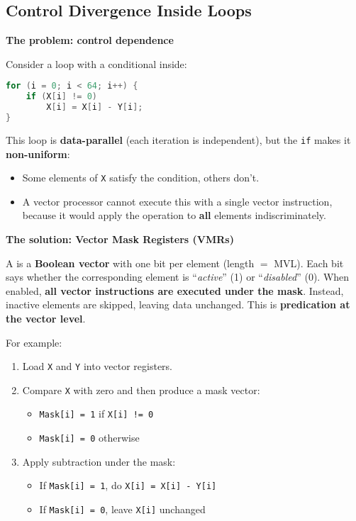 \subsection{Control Divergence Inside Loops}

\begin{flushleft}
    \textcolor{Red2}{ \textbf{The problem: control dependence}}
\end{flushleft}
Consider a loop with a conditional inside:
\begin{lstlisting}[language=c]
for (i = 0; i < 64; i++) {
    if (X[i] != 0)
        X[i] = X[i] - Y[i];
}\end{lstlisting}
This loop is \textbf{data-parallel} (each iteration is independent), but the \texttt{if} makes it \textbf{non-uniform}:
\begin{itemize}
    \item Some elements of \texttt{X} satisfy the condition, others don't.
    \item A \naive vector processor cannot execute this with a single vector instruction, because it would apply the operation to \textbf{all} elements indiscriminately.
\end{itemize}

\highspace
\begin{flushleft}
    \textcolor{Green3}{ \textbf{The solution: Vector Mask Registers (VMRs)}}
\end{flushleft}
A  is a \textbf{Boolean vector} with one bit per element (length $=$ MVL). Each bit says whether the corresponding element is ``\emph{active}'' (1) or ``\emph{disabled}'' (0). When enabled, \textbf{all vector instructions are executed under the mask}. Instead, inactive elements are skipped, leaving data unchanged. This is \textbf{predication at the vector level}.

\highspace
For example:
\begin{enumerate}
    \item Load \texttt{X} and \texttt{Y} into vector registers.
    \item Compare \texttt{X} with zero and then produce a mask vector:
    \begin{itemize}
        \item \texttt{Mask[i] = 1} if \texttt{X[i] != 0}
        \item \texttt{Mask[i] = 0} otherwise
    \end{itemize}
    \item Apply subtraction under the mask:
    \begin{itemize}
        \item If \texttt{Mask[i] = 1}, do \texttt{X[i] = X[i] - Y[i]}
        \item If \texttt{Mask[i] = 0}, leave \texttt{X[i]} unchanged
    \end{itemize}
\end{enumerate}

